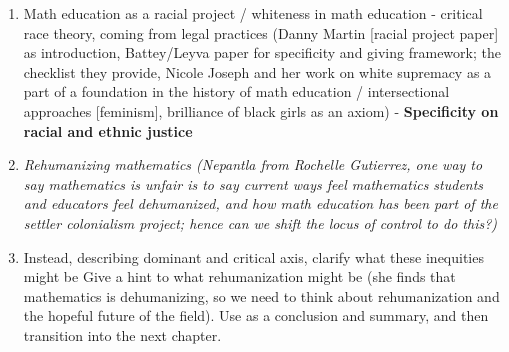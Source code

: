 \begin{enumerate}
\begin{enumerate}
\begin{enumerate}
\begin{enumerate}
        \item Math education as a racial project / whiteness in math education - critical race theory, coming from legal practices (Danny Martin [racial project paper] as introduction, Battey/Leyva paper for specificity and giving framework; the checklist they provide, Nicole Joseph and her work on white supremacy as a part of a foundation in the history of math education / intersectional approaches [feminism], brilliance of black girls as an axiom) - {\bf Specificity on racial and ethnic justice}
        \item \textit{Rehumanizing mathematics (Nepantla from Rochelle Gutierrez, one way to say mathematics is unfair is to say current ways feel mathematics students and educators feel dehumanized, and how math education has been part of the settler colonialism project; hence can we shift the locus of control to do this?)}
        \item Instead, describing dominant and critical axis, clarify what these inequities might be Give a hint to what rehumanization might be (she finds that mathematics is dehumanizing, so we need to think about rehumanization and the hopeful future of the field). Use as a conclusion and summary, and then transition into the next chapter.
      \end{enumerate}
    \end{enumerate}

\end{enumerate}
\end{enumerate}
